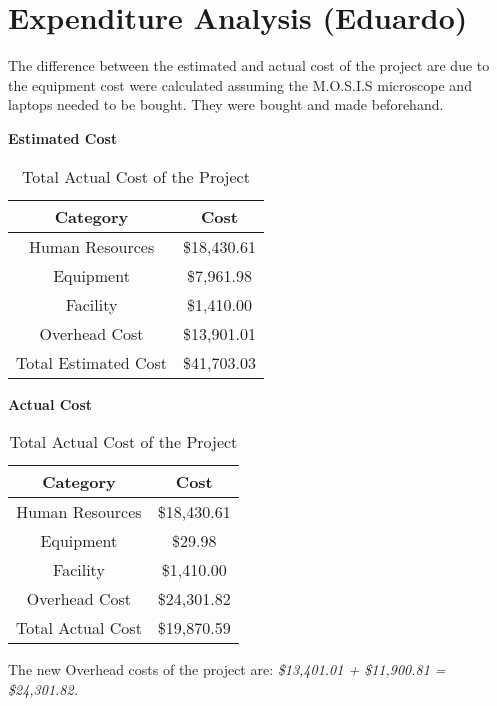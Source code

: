 \section{Expenditure Analysis (Eduardo)}
The difference between the estimated and actual cost of the project are due to the equipment cost were calculated assuming the M.O.S.I.S microscope and laptops needed to be bought. They were bought and made beforehand. \\
\begin{table}[h]
    \centering
    \textbf{Estimated Cost}\\
    \begin{tabular}{||c | c||} 
     \hline
     \rowcolor{cyan!50}
     Category & Cost \\ [0.5ex] 
     \hline
     Human Resources & \$18,430.61\\ 
     \hline
     Equipment & \$7,961.98\\
     \hline
     Facility & \$1,410.00\\
     \hline
     Overhead Cost & \$13,901.01\\
     \hline
     \rowcolor{teal!50}
     Total Estimated Cost & \$41,703.03\\
     \hline
    \end{tabular}
    \caption {Total Estimated Cost of the Project}
    \label {table:1}
\textbf{Actual Cost}\\
    \begin{tabular}{||c | c||} 
     \hline
     \rowcolor{cyan!50}
     Category & Cost \\ [0.5ex] 
     \hline
     Human Resources & \$18,430.61\\ 
     \hline
     Equipment & \$29.98 \\
     \hline
     Facility & \$1,410.00\\
     \hline
     Overhead Cost & \$24,301.82\\
     \hline
     \rowcolor{teal!50}
     Total Actual Cost & \$19,870.59\\
     \hline
    \end{tabular}
    \caption {Total Actual Cost of the Project}
    \label {table:2}
\end{table}
The new Overhead costs of the project are:
\textit{\$13,401.01 + \$11,900.81 = \$24,301.82.}\\